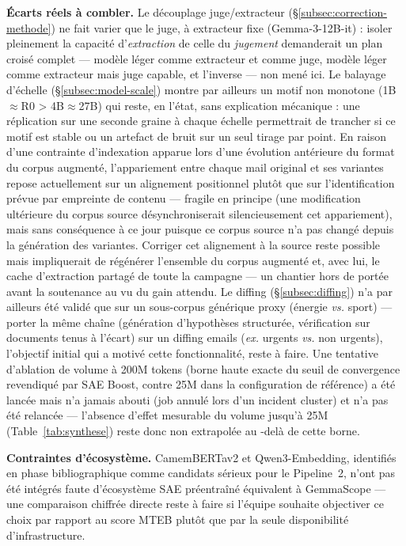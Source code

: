 \documentclass[11pt]{article}
\begin{document}
\textbf{Écarts réels à combler.} Le découplage juge/extracteur
(\S\ref{subsec:correction-methode}) ne fait varier que le juge, à extracteur
fixe (Gemma-3-12B-it) : isoler pleinement la capacité d'\emph{extraction} de
celle du \emph{jugement} demanderait un plan croisé complet --- modèle léger
comme extracteur et comme juge, modèle léger comme extracteur mais juge
capable, et l'inverse --- non mené ici. Le balayage d'échelle
(\S\ref{subsec:model-scale}) montre par ailleurs un motif non monotone
(1B$\approx$R0 > 4B$\approx$27B) qui reste, en l'état, sans explication
mécanique : une réplication sur une seconde graine à chaque échelle
permettrait de trancher si ce motif est stable ou un artefact de bruit sur
un seul tirage par point. En raison d'une contrainte d'indexation apparue
lors d'une évolution antérieure du format du corpus augmenté, l'appariement
entre chaque mail original et ses variantes repose actuellement sur un
alignement positionnel plutôt que sur l'identification prévue par empreinte
de contenu --- fragile en principe (une modification ultérieure du corpus
source désynchroniserait silencieusement cet appariement), mais sans
conséquence à ce jour puisque ce corpus source n'a pas changé depuis la
génération des variantes. Corriger cet alignement à la source reste possible
mais impliquerait de régénérer l'ensemble du corpus augmenté et, avec lui,
le cache d'extraction partagé de toute la campagne --- un chantier hors de
portée avant la soutenance au vu du gain attendu.
Le diffing (\S\ref{subsec:diffing}) n'a par ailleurs été validé que sur un
sous-corpus générique proxy (énergie \emph{vs.} sport) --- porter la même
chaîne (génération d'hypothèses structurée, vérification sur documents tenus
à l'écart) sur un diffing emails (\emph{ex.} urgents \emph{vs.} non urgents),
l'objectif initial qui a motivé cette fonctionnalité, reste à faire. Une
tentative d'ablation de volume à 200M tokens (borne haute exacte du seuil de
convergence revendiqué par SAE Boost, contre 25M dans la configuration de
référence) a été lancée mais n'a jamais abouti (job annulé lors d'un
incident cluster) et n'a pas été relancée --- l'absence d'effet mesurable du
volume jusqu'à 25M (Table~\ref{tab:synthese}) reste donc non extrapolée au
-delà de cette borne.

\textbf{Contraintes d'écosystème.} CamemBERTav2 et Qwen3-Embedding,
identifiés en phase bibliographique comme candidats sérieux pour le
Pipeline~2, n'ont pas été intégrés faute d'écosystème SAE préentraîné
équivalent à GemmaScope --- une comparaison chiffrée directe reste à faire
si l'équipe souhaite objectiver ce choix par rapport au score MTEB plutôt
que par la seule disponibilité d'infrastructure.
\end{document}
